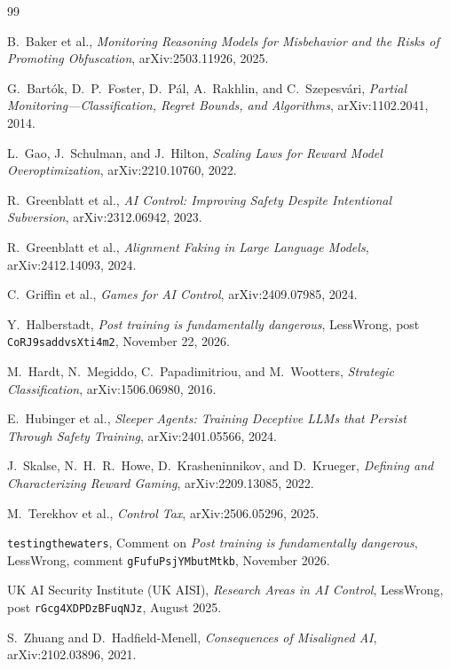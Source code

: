 \documentclass[11pt,a4paper]{article}
\begin{document}
\begin{thebibliography}{99}

B.~Baker et al.,
\emph{Monitoring Reasoning Models for Misbehavior and the Risks of Promoting Obfuscation},
arXiv:2503.11926, 2025.

G.~Bart\'ok, D.~P.~Foster, D.~P\'al, A.~Rakhlin, and C.~Szepesv\'ari,
\emph{Partial Monitoring---Classification, Regret Bounds, and Algorithms},
arXiv:1102.2041, 2014.

L.~Gao, J.~Schulman, and J.~Hilton,
\emph{Scaling Laws for Reward Model Overoptimization},
arXiv:2210.10760, 2022.

R.~Greenblatt et al.,
\emph{AI Control: Improving Safety Despite Intentional Subversion},
arXiv:2312.06942, 2023.

R.~Greenblatt et al.,
\emph{Alignment Faking in Large Language Models},
arXiv:2412.14093, 2024.

C.~Griffin et al.,
\emph{Games for AI Control},
arXiv:2409.07985, 2024.

Y.~Halberstadt,
\emph{Post training is fundamentally dangerous},
LessWrong, post \texttt{CoRJ9saddvsXti4m2}, November 22, 2026.

M.~Hardt, N.~Megiddo, C.~Papadimitriou, and M.~Wootters,
\emph{Strategic Classification},
arXiv:1506.06980, 2016.

E.~Hubinger et al.,
\emph{Sleeper Agents: Training Deceptive LLMs that Persist Through Safety Training},
arXiv:2401.05566, 2024.

J.~Skalse, N.~H.~R.~Howe, D.~Krasheninnikov, and D.~Krueger,
\emph{Defining and Characterizing Reward Gaming},
arXiv:2209.13085, 2022.

M.~Terekhov et al.,
\emph{Control Tax},
arXiv:2506.05296, 2025.

\texttt{testingthewaters},
Comment on \emph{Post training is fundamentally dangerous},
LessWrong, comment \texttt{gFufuPsjYMbutMtkb}, November 2026.

UK AI Security Institute (UK AISI),
\emph{Research Areas in AI Control},
LessWrong, post \texttt{rGcg4XDPDzBFuqNJz}, August 2025.

S.~Zhuang and D.~Hadfield-Menell,
\emph{Consequences of Misaligned AI},
arXiv:2102.03896, 2021.

\end{thebibliography}
\end{document}
